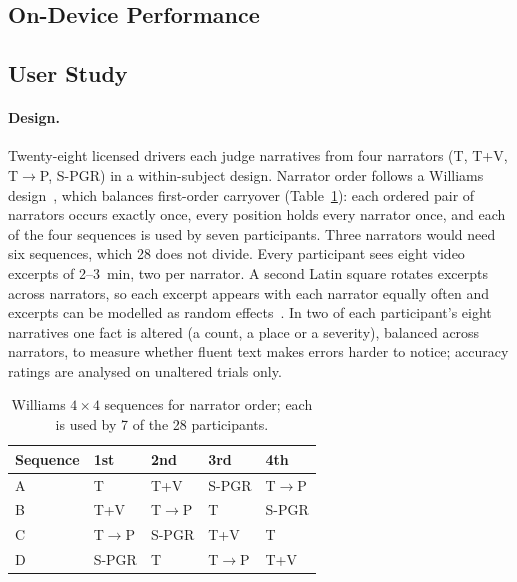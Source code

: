 \subsection{On-Device Performance}
\label{sec:device}

\subsection{User Study}
\label{sec:study}

\paragraph{Design.}
Twenty-eight licensed drivers each judge narratives from four narrators (T, T+V, T$\rightarrow$P, S-PGR) in a within-subject design.
Narrator order follows a Williams design~\cite{williams1949designs}, which balances first-order carryover (Table~\ref{tab:williams}): each ordered pair of narrators occurs exactly once, every position holds every narrator once, and each of the four sequences is used by seven participants.
Three narrators would need six sequences, which 28 does not divide.
Every participant sees eight video excerpts of 2--3~min, two per narrator.
A second Latin square rotates excerpts across narrators, so each excerpt appears with each narrator equally often and excerpts can be modelled as random effects~\cite{judd2012stimuli}.
In two of each participant's eight narratives one fact is altered (a count, a place or a severity), balanced across narrators, to measure whether fluent text makes errors harder to notice; accuracy ratings are analysed on unaltered trials only.

\begin{table}[t]
\caption{Williams $4\times4$ sequences for narrator order; each is used by 7 of the 28 participants.}
\label{tab:williams}
\small
\begin{tabular}{@{}lllll@{}}
\toprule
Sequence & 1st & 2nd & 3rd & 4th\\
\midrule
A & T & T+V & S-PGR & T$\rightarrow$P\\
B & T+V & T$\rightarrow$P & T & S-PGR\\
C & T$\rightarrow$P & S-PGR & T+V & T\\
D & S-PGR & T & T$\rightarrow$P & T+V\\
\bottomrule
\end{tabular}
\end{table}

